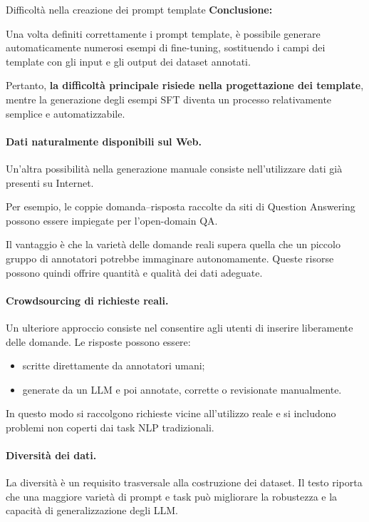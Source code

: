 \begin{observation}{Difficoltà nella creazione dei prompt template}
\textbf{Conclusione:}

Una volta definiti correttamente i prompt template, è possibile
generare automaticamente numerosi esempi di fine-tuning,
sostituendo i campi dei template con gli input e gli output
dei dataset annotati.

Pertanto, \textbf{la difficoltà principale risiede nella
progettazione dei template}, mentre la generazione degli esempi
SFT diventa un processo relativamente semplice e automatizzabile.

\end{observation}


\paragraph{Dati naturalmente disponibili sul Web.}
Un'altra possibilità nella generazione manuale consiste nell'utilizzare
dati già presenti su Internet.

Per esempio, le coppie domanda--risposta raccolte
da siti di Question Answering possono essere impiegate
per l'open-domain QA.

Il vantaggio è che la varietà delle domande reali
supera quella che un piccolo gruppo di annotatori
potrebbe immaginare autonomamente.
Queste risorse possono quindi offrire quantità
e qualità dei dati adeguate.

\paragraph{Crowdsourcing di richieste reali.}
Un ulteriore approccio consiste nel consentire
agli utenti di inserire liberamente delle domande.
Le risposte possono essere:

\begin{itemize}
    \item scritte direttamente da annotatori umani;

    \item generate da un LLM e poi annotate,
    corrette o revisionate manualmente.
\end{itemize}

In questo modo si raccolgono richieste vicine
all'utilizzo reale e si includono problemi
non coperti dai task NLP tradizionali.

\paragraph{Diversità dei dati.}
La diversità è un requisito trasversale alla costruzione
dei dataset. Il testo riporta che una maggiore varietà
di prompt e task può migliorare la robustezza
e la capacità di generalizzazione degli LLM.

